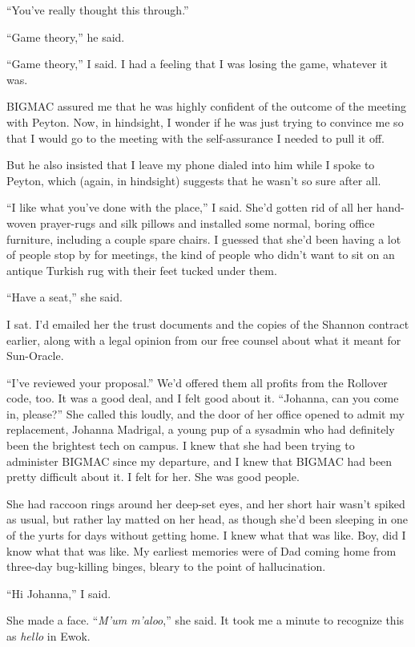 “You've really thought this through.”

“Game theory,” he said.

“Game theory,” I said. I had a feeling that I was losing the game, 
whatever it was.

\tb

BIGMAC assured me that he was highly confident of the outcome of the 
meeting with Peyton. Now, in hindsight, I wonder if he was just trying 
to convince me so that I would go to the meeting with the 
self-assurance I needed to pull it off.

But he also insisted that I leave my phone dialed into him while I 
spoke to Peyton, which (again, in hindsight) suggests that he wasn't so 
sure after all.

“I like what you've done with the place,” I said. She'd gotten rid 
of all her hand-woven prayer-rugs and silk pillows and installed some 
normal, boring office furniture, including a couple spare chairs. I 
guessed that she'd been having a lot of people stop by for meetings, 
the kind of people who didn't want to sit on an antique Turkish rug 
with their feet tucked under them.

“Have a seat,” she said.

I sat. I'd emailed her the trust documents and the copies of the 
Shannon contract earlier, along with a legal opinion from our free 
counsel about what it meant for Sun-Oracle.

“I've reviewed your proposal.” We'd offered them all profits from 
the Rollover code, too. It was a good deal, and I felt good about it. 
“Johanna, can you come in, please?” She called this loudly, and the 
door of her office opened to admit my replacement, Johanna Madrigal, a 
young pup of a sysadmin who had definitely been the brightest tech on 
campus. I knew that she had been trying to administer BIGMAC since my 
departure, and I knew that BIGMAC had been pretty difficult about it. I 
felt for her. She was good people.

She had raccoon rings around her deep-set eyes, and her short hair 
wasn't spiked as usual, but rather lay matted on her head, as though 
she'd been sleeping in one of the yurts for days without getting home. 
I knew what that was like. Boy, did I know what that was like. My 
earliest memories were of Dad coming home from three-day bug-killing 
binges, bleary to the point of hallucination.

“Hi Johanna,” I said.

She made a face. “\emph{M'um m'aloo},” she said. It took me a 
minute to recognize this as \emph{hello} in Ewok.

